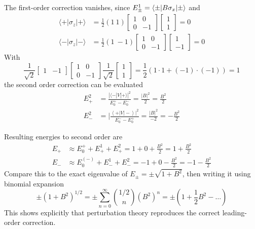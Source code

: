 \documentclass[../../../main.tex]{subfiles}
\begin{document}
The first-order correction vanishes, since $E^1_\pm=\braket{\pm  | B\sigma_x |\pm}$ and 
\begin{align*}
\langle + |\sigma_z |+\rangle & = \frac{1}{2} (1 \ 1)  \begin{bmatrix} 1 & 0 \\ 0 & -1 \end{bmatrix}   \begin{bmatrix} 1 \\ 1 \end{bmatrix}  = 0\\
\langle - |\sigma_z |-\rangle & = \frac{1}{2} (1 \ -1)  \begin{bmatrix} 1 & 0 \\ 0 & -1 \end{bmatrix}   \begin{bmatrix} 1 \\ -1 \end{bmatrix}  = 0
\end{align*}
With
\begin{equation*}
    \frac{1}{\sqrt{2}} \begin{bmatrix} 1 & -1 \end{bmatrix}  \begin{bmatrix} 1 & 0 \\ 0 & -1 \end{bmatrix} \frac{1}{\sqrt{2}} \begin{bmatrix} 1 \\ 1 \end{bmatrix}  = \frac{1}{2}(1 \cdot 1 + (-1) \cdot (-1)) = 1
\end{equation*} 
the second order correction can be evaluated
\begin{align*}
E_{+}^{2} & =  \frac{|\langle - | V | + \rangle|^{2}}{E_{0}^{+} - E_{0}^{-}} = \frac{\left| B \right|^{2}}{2} = \frac{B^{2}}{2}\\
E_{-}^{2} & =  |\frac{\left\langle + | V | - \right\rangle|^{2}}{E_{0}^{-} - E_{0}^{+}} = \frac{\left| B \right|^{2}}{-2} = -\frac{B^{2}}{2}
\end{align*}

Resulting energies to second order are 
\begin{align*}
E_+& \approx E_0^{+} + E^{1}_+ + E^{2}_+ = 1 + 0 + \frac{B^2}{2} = 1 + \frac{B^2}{2}\\
E_- &\approx E_0^{(-)} + E^{1}_- + E^{2}_- = -1 + 0 - \frac{B^2}{2} = -1 - \frac{B^2}{2}
\end{align*}
Compare this to the exact eigenvalue of $E_\pm = \pm \sqrt{1+B^2 }$, then writing it using binomial expansion
\begin{equation*}
    \pm(1 + B^2)^{1/2} =\pm \sum_{n=0}^{\infty} \binom{1/2}{n} (B^2)^{n} 
    =\pm     \left( 1 + \frac{1}{2} B^2 - \dots \right) 
\end{equation*}
This shows explicitly that perturbation theory reproduces the correct leading-order correction.
\end{document}
